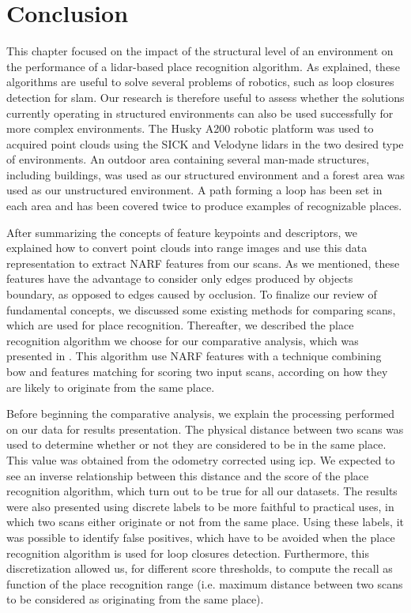 \section{Conclusion}
\label{sec:chap_slam_conclu}

This chapter focused on the impact of the structural level of an environment on the performance of a \gls*{lidar}-based place recognition algorithm. As explained, these algorithms are useful to solve several problems of robotics, such as loop closures detection for \gls*{slam}. Our research is therefore useful to assess whether the solutions currently operating in structured environments can also be used successfully for more complex environments. The Husky A200 robotic platform was used to acquired point clouds using the SICK and Velodyne \gls*{lidar}s in the two desired type of environments. An outdoor area containing several man-made structures, including buildings, was used as our structured environment and a forest area was used as our unstructured environment. A path forming a loop has been set in each area and has been covered twice to produce examples of recognizable places.

After summarizing the concepts of feature keypoints and descriptors, we explained how to convert point clouds into range images and use this data representation to extract NARF features from our scans. As we mentioned, these features have the advantage to consider only edges produced by objects boundary, as opposed to edges caused by occlusion. To finalize our review of fundamental concepts, we discussed some existing methods for comparing scans, which are used for place recognition. Thereafter, we described the place recognition algorithm we choose for our comparative analysis, which was presented in \citep{Steder2011b}. This algorithm use NARF features with a technique combining \gls*{bow} and features matching for scoring two input scans, according on how they are likely to originate from the same place. 

Before beginning the comparative analysis, we explain the processing performed on our data for results presentation. The physical distance between two scans was used to determine whether or not they are considered to be in the same place. This value was obtained from the odometry corrected using \gls*{icp}. We expected to see an inverse relationship between this distance and the score of the place recognition algorithm, which turn out to be true for all our datasets. The results were also presented using discrete labels to be more faithful to practical uses, in which two scans either originate or not from the same place. Using these labels, it was possible to identify false positives, which have to be avoided when the place recognition algorithm is used for loop closures detection. Furthermore, this discretization allowed us, for different score thresholds, to compute the recall as function of the place recognition range (i.e. maximum distance between two scans to be considered as originating from the same place).

